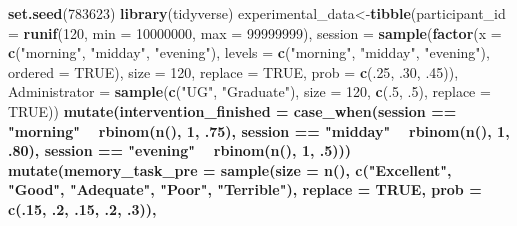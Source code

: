 \documentclass[]{book}
\newenvironment{Shaded}{\begin{snugshade}}{\end{snugshade}}
\newcommand{\DataTypeTok}[1]{\textcolor[rgb]{0.13,0.29,0.53}{#1}}
\newcommand{\DecValTok}[1]{\textcolor[rgb]{0.00,0.00,0.81}{#1}}
\newcommand{\FloatTok}[1]{\textcolor[rgb]{0.00,0.00,0.81}{#1}}
\newcommand{\KeywordTok}[1]{\textcolor[rgb]{0.13,0.29,0.53}{\textbf{#1}}}
\newcommand{\NormalTok}[1]{#1}
\newcommand{\OperatorTok}[1]{\textcolor[rgb]{0.81,0.36,0.00}{\textbf{#1}}}
\newcommand{\OtherTok}[1]{\textcolor[rgb]{0.56,0.35,0.01}{#1}}
\newcommand{\StringTok}[1]{\textcolor[rgb]{0.31,0.60,0.02}{#1}}
\theoremstyle{definition}
\theoremstyle{definition}
\theoremstyle{definition}
\theoremstyle{remark}
\begin{document}
\begin{Shaded}
\begin{Highlighting}[]
\KeywordTok{set.seed}\NormalTok{(}\DecValTok{783623}\NormalTok{)}
\KeywordTok{library}\NormalTok{(tidyverse)}
\NormalTok{experimental_data<-}\KeywordTok{tibble}\NormalTok{(}\DataTypeTok{participant_id =} \KeywordTok{runif}\NormalTok{(}\DecValTok{120}\NormalTok{, }\DataTypeTok{min =} \DecValTok{10000000}\NormalTok{, }\DataTypeTok{max =} \DecValTok{99999999}\NormalTok{),}
  \DataTypeTok{session =} \KeywordTok{sample}\NormalTok{(}\KeywordTok{factor}\NormalTok{(}\DataTypeTok{x =} \KeywordTok{c}\NormalTok{(}\StringTok{"morning"}\NormalTok{, }\StringTok{"midday"}\NormalTok{, }\StringTok{"evening"}\NormalTok{), }\DataTypeTok{levels =} \KeywordTok{c}\NormalTok{(}\StringTok{"morning"}\NormalTok{, }\StringTok{"midday"}\NormalTok{, }\StringTok{"evening"}\NormalTok{), }\DataTypeTok{ordered =} \OtherTok{TRUE}\NormalTok{), }\DataTypeTok{size =} \DecValTok{120}\NormalTok{, }\DataTypeTok{replace =} \OtherTok{TRUE}\NormalTok{, }\DataTypeTok{prob =} \KeywordTok{c}\NormalTok{(.}\DecValTok{25}\NormalTok{, }\FloatTok{.30}\NormalTok{, }\FloatTok{.45}\NormalTok{)),}
          \DataTypeTok{Administrator =} \KeywordTok{sample}\NormalTok{(}\KeywordTok{c}\NormalTok{(}\StringTok{"UG"}\NormalTok{, }\StringTok{"Graduate"}\NormalTok{), }\DataTypeTok{size =} \DecValTok{120}\NormalTok{, }\KeywordTok{c}\NormalTok{(.}\DecValTok{5}\NormalTok{, }\FloatTok{.5}\NormalTok{), }\DataTypeTok{replace =} \OtherTok{TRUE}\NormalTok{))}\OperatorTok{%
\StringTok{  }\KeywordTok{mutate}\NormalTok{(}\DataTypeTok{intervention_finished =} \KeywordTok{case_when}\NormalTok{(session }\OperatorTok{==}\StringTok{ "morning"} \OperatorTok{~}\StringTok{ }\KeywordTok{rbinom}\NormalTok{(}\KeywordTok{n}\NormalTok{(), }\DecValTok{1}\NormalTok{, }\FloatTok{.75}\NormalTok{),}
\NormalTok{                               session }\OperatorTok{==}\StringTok{ "midday"} \OperatorTok{~}\StringTok{ }\KeywordTok{rbinom}\NormalTok{(}\KeywordTok{n}\NormalTok{(), }\DecValTok{1}\NormalTok{, }\FloatTok{.80}\NormalTok{), }
\NormalTok{                               session }\OperatorTok{==}\StringTok{ "evening"} \OperatorTok{~}\StringTok{ }\KeywordTok{rbinom}\NormalTok{(}\KeywordTok{n}\NormalTok{(), }\DecValTok{1}\NormalTok{, }\FloatTok{.5}\NormalTok{)))}\OperatorTok{%
\StringTok{  }\KeywordTok{mutate}\NormalTok{(}\DataTypeTok{memory_task_pre =} \KeywordTok{sample}\NormalTok{(}\DataTypeTok{size =} \KeywordTok{n}\NormalTok{(), }\KeywordTok{c}\NormalTok{(}\StringTok{"Excellent"}\NormalTok{, }\StringTok{"Good"}\NormalTok{, }\StringTok{"Adequate"}\NormalTok{, }\StringTok{"Poor"}\NormalTok{, }\StringTok{"Terrible"}\NormalTok{), }\DataTypeTok{replace =} \OtherTok{TRUE}\NormalTok{, }\DataTypeTok{prob =} \KeywordTok{c}\NormalTok{(.}\DecValTok{15}\NormalTok{, }\FloatTok{.2}\NormalTok{, }\FloatTok{.15}\NormalTok{, }\FloatTok{.2}\NormalTok{, }\FloatTok{.3}\NormalTok{)),}
}}
\end{Highlighting}
\end{Shaded}
\end{document}
